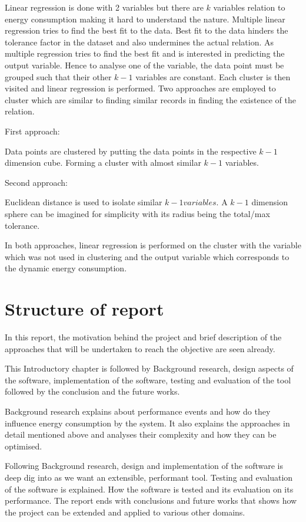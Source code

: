 Linear regression is done with 2 variables but there are \(k\) variables relation to energy consumption making it hard to understand the nature. Multiple linear regression tries to find the best fit to the data. Best fit to the data hinders the tolerance factor in the dataset and also undermines the actual relation. As multiple regression tries to find the best fit and is interested in predicting the output variable. Hence to analyse one of the variable, the data point must be grouped such that their other \(k-1\) variables are constant. Each cluster is then visited and linear regression is performed. Two approaches are employed to cluster which are similar to finding similar records in finding the existence of the relation.

First approach:

Data points are clustered by putting the data points in the respective \(k-1\) dimension cube. Forming a cluster with almost similar \(k-1\) variables.

Second approach:

Euclidean distance is used to isolate similar \(k-1 variables\). A \(k-1\) dimension sphere can be imagined for simplicity with its radius being the total/max tolerance.

In both approaches, linear regression is performed on the cluster with the variable which was not used in clustering and the output variable which corresponds to the dynamic energy consumption.

\section{Structure of report}

In this report, the motivation behind the project and brief description of the approaches that will be undertaken to reach the objective are seen already.

This Introductory chapter is followed by Background research, design aspects of the software, implementation of the software, testing and evaluation of the tool followed by the conclusion and the future works.

Background research explains about performance events and how do they influence energy consumption by the system. It also explains the approaches in detail mentioned above and analyses their complexity and how they can be optimised.

Following Background research, design and implementation of the software is deep dig into as we want an extensible, performant tool. Testing and evaluation of the software is explained. How the software is tested and its evaluation on its performance. The report ends with conclusions and future works that shows how the project can be extended and applied to various other domains.